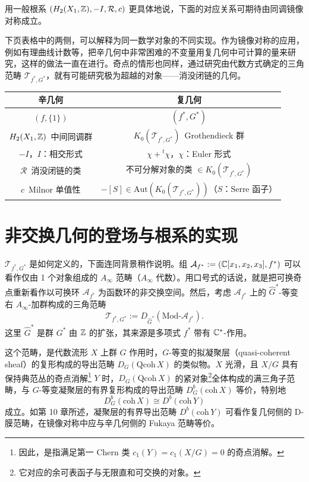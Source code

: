 用一般根系 $(H_2(X_1,\mathbb{Z}),-I,\mathcal{R},c)$ 更具体地说，下面的对应关系可期待由同调镜像对称成立。

下页表格中的两侧，可以解释为同一数学对象的不同实现。作为镜像对称的应用，例如有理曲线计数等，把辛几何中非常困难的不变量用复几何中可计算的量来研究，这样的做法一直在进行。奇点的情形也同样，通过研究由代数方式确定的三角范畴 $\mathcal{T}_{f^*,G^*}$，就有可能研究极为超越的对象——消没闭链的几何。

\begin{table}[htbp]
\centering
\begin{tabular}{c|c}
\hline
辛几何 & 复几何 \\
\hline
$(f,\{1\})$ & $(f^*,G^*)$ \\
\hline
$H_2(X_1,\mathbb{Z})$\ 中间同调群 & $K_0(\mathcal{T}_{f^*,G^*})$\ Grothendieck 群 \\
\hline
$-I$，$I$：相交形式 & $\chi+{}^t\chi$，$\chi$：Euler 形式 \\
\hline
$\mathcal{R}$\ 消没闭链的类 & 不可分解对象的类 $\in K_0(\mathcal{T}_{f^*,G^*})$ \\
\hline
$c$\ Milnor 单值性 & $-[S]\in\mathrm{Aut}(K_0(\mathcal{T}_{f^*,G^*}))$（$S$：Serre 函子）\\
\hline
\end{tabular}
\end{table}

\section{非交换几何的登场与根系的实现}

$\mathcal{T}_{f^*,G^*}$ 是如何定义的，下面连同背景稍作说明。组 $\mathcal{A}_{f^*}:=(\mathbb{C}[x_1,x_2,x_3],f^*)$ 可以看作仅由 1 个对象组成的 $A_\infty$ 范畴（$A_\infty$ 代数）。用口号式的话说，就是把可换奇点重新看作以可换环 $\mathcal{A}_{f^*}$ 为函数环的非交换空间。然后，考虑 $\mathcal{A}_{f^*}$ 上的 $\widehat{G}^*$-等变右 $A_\infty$-加群构成的三角范畴
%
\[
  \mathcal{T}_{f^*,G^*}:=D_{\widehat{G}^*}(\mathrm{Mod}\text{-}\mathcal{A}_{f^*}).
\]
%
这里 $\widehat{G}^*$ 是群 $G^*$ 由 $\mathbb{Z}$ 的扩张，其来源是多项式 $f^*$ 带有 $\mathbb{C}^*$-作用。

这个范畴，是代数流形 $X$ 上群 $G$ 作用时，$G$-等变的拟凝聚层（quasi-coherent sheaf）的复形构成的导出范畴 $D_G(\mathrm{Qcoh}\,X)$ 的类似物。$X$ 光滑，且 $X/G$ 具有保持典范丛的奇点消解\footnote{因此，是指满足第一 Chern 类 $c_1(Y)=c_1(X/G)=0$ 的奇点消解。} $Y$ 时，$D_G(\mathrm{Qcoh}\,X)$ 的紧对象\footnote{它对应的余可表函子与无限直和可交换的对象。}全体构成的满三角子范畴，与 $G$-等变凝聚层的有界复形构成的导出范畴 $D^b_G(\mathrm{coh}\,X)$ 等价，特别地
%
\[
  D^b_G(\mathrm{coh}\,X)\cong D^b(\mathrm{coh}\,Y)
\]
%
成立。如第 10 章所述，凝聚层的有界导出范畴 $D^b(\mathrm{coh}\,Y)$ 可看作复几何侧的 D-膜范畴，在镜像对称中应与辛几何侧的 Fukaya 范畴等价。

